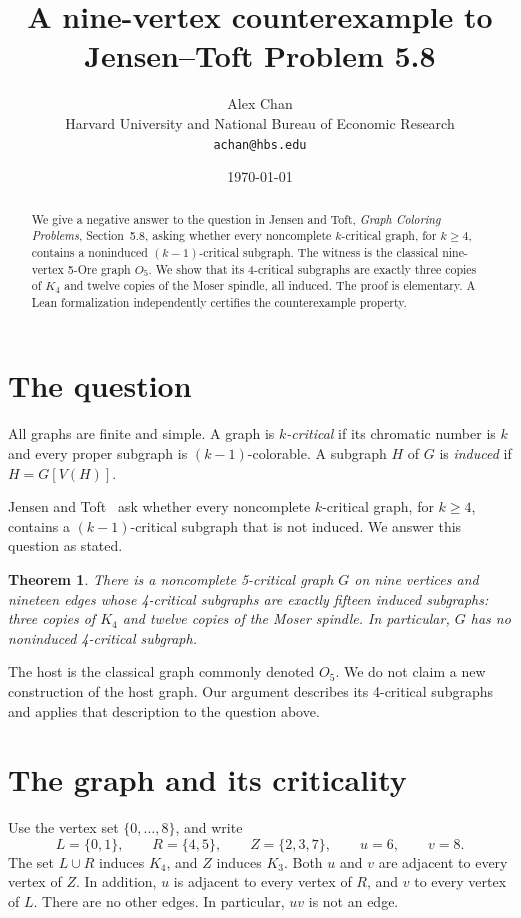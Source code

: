 \documentclass[11pt]{article}
\title{A nine-vertex counterexample to\\Jensen--Toft Problem 5.8}
\author{Alex Chan\\[2pt]
  \small Harvard University and National Bureau of Economic Research\\[-1pt]
  \small \texttt{achan@hbs.edu}}
\date{\today}
\newtheorem{theorem}{Theorem}
\begin{document}
\maketitle

\begin{abstract}
We give a negative answer to the question in Jensen and Toft,
\emph{Graph Coloring Problems}, Section~5.8, asking whether every
noncomplete $k$-critical graph, for $k\geq4$, contains a noninduced
$(k-1)$-critical subgraph. The witness is the classical nine-vertex
5-Ore graph $O_5$. We show that its 4-critical subgraphs are exactly
three copies of $K_4$ and twelve copies of the Moser spindle, all
induced. The proof is elementary. A Lean formalization independently
certifies the counterexample property.
\end{abstract}

\section{The question}

All graphs are finite and simple. A graph is \emph{$k$-critical} if
its chromatic number is $k$ and every proper subgraph is
$(k-1)$-colorable. A subgraph $H$ of $G$ is \emph{induced} if
$H=G[V(H)]$.

Jensen and Toft~\cite[Section~5.8, p.~103]{JT} ask whether every
noncomplete $k$-critical graph, for $k\geq4$, contains a
$(k-1)$-critical subgraph that is not induced. We answer this
question as stated.

\begin{theorem}\label{thm:main}
There is a noncomplete 5-critical graph $G$ on nine vertices and
nineteen edges whose 4-critical subgraphs are exactly fifteen
induced subgraphs: three copies of $K_4$ and twelve copies of the
Moser spindle. In particular, $G$ has no noninduced 4-critical
subgraph.
\end{theorem}

The host is the classical graph commonly denoted $O_5$.
We do not claim a new construction of the host graph. Our argument
describes its 4-critical subgraphs and applies that description
to the question above.

\section{The graph and its criticality}

Use the vertex set $\{0,\ldots,8\}$, and write
\[
 L=\{0,1\},\qquad R=\{4,5\},\qquad
 Z=\{2,3,7\},\qquad u=6,\qquad v=8.
\]
The set $L\cup R$ induces $K_4$, and $Z$ induces $K_3$.
Both $u$ and $v$ are adjacent to every vertex of $Z$.
In addition, $u$ is adjacent to every vertex of $R$, and $v$
to every vertex of $L$. There are no other edges. In particular,
$uv$ is not an edge.
\end{document}
